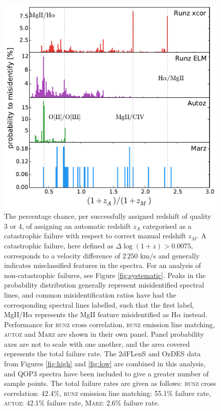 \documentclass[iop]{emulateapj}
\newcommand{\runz}{\textsc{runz}}
\newcommand{\autoz}{\textsc{autoz}}
\newcommand{\marz}{\textsc{Marz}}
\begin{document}
\begin{figure}[h]
\centering
\includegraphics[width=\columnwidth]{errorRateqop3.pdf}
\caption{The percentage chance, per successfully assigned redshift of quality 3 or 4, of assigning an automatic redshift $z_A$ categorised as a catastrophic failure with respect to correct manual redshift $z_M$. A catastrophic failure, here defined as $\Delta \log(1 + z) > 0.0075$, corresponds to a velocity difference of $2\,250$ km/s and generally indicates misclassified features in the spectra. For an analysis of non-catastrophic failures, see Figure \ref{fig:systematic}. Peaks in the probability distribution generally represent misidentified spectral lines, and common misidentification ratios have had the corresponding spectral lines labelled, such that the first label, MgII/H$\alpha$ represents the MgII feature misidentified as H$\alpha$ instead. Performance for \runz{} cross correlation, \runz{} emission line matching, \autoz{} and \marz{} are shown in their own panel. Panel probability axes are not to scale with one another, and the area covered represents the total failure rate. The 2dFLenS and OzDES data from Figures \ref{fig:high} and \ref{fig:low} are combined in this analysis, and QOP3 spectra have been included to give a greater number of sample points. The total failure rates are given as follows: \runz{} cross correlation: 42.4\%, \runz{} emission line matching: 55.1\% failure rate, \autoz{}: 42.1\% failure rate, \marz{}: 2.6\% failure rate.}
\label{fig:f4}
\end{figure}
\end{document}
